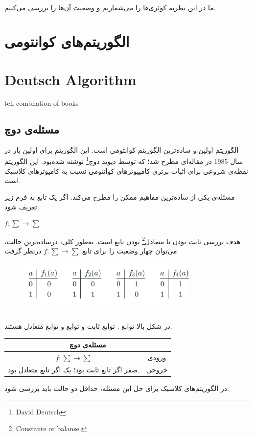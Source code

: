 \documentclass{book}
\begin{document}
ما در این نظریه کوئری‌ها را می‌شماریم و وضعیت آن‌‌ها را بررسی می‌کنیم.

\section*{الگوریتم‌های کوانتومی}


	
\section{Deutsch Algorithm}
tell combnation of books
\subsection{مسئله‌ی دوچ}
الگوریتم  اولین و ساده‌ترین الگوریتم کوانتومی‌ است. این الگوریتم برای اولین بار در سال 1985 در مقاله‌ای مطرح شد؛ که توسط دیوید دوچ\footnote{David Deutsch} نوشته شده‌‌بود. این الگوریتم نقطه‌ی شروعی برای اثبات برتری کامپیوترهای کوانتومی نسبت به کامپوترهای کلاسیک است.

مسئله‌ی  یکی از ساده‌ترین مفاهیم ممکن را مطرح می‌کند. اگر یک تابع به فرم زیر تعریف شود: 
\begin{center}
	$f : \sum \rightarrow \sum$
\end{center}
هدف بررسی ثابت بودن یا متعادل\footnote{Constante or balanse.} بودن تابع  است. 
به‌طور کلی، درساده‌ترین حالت، می‌توان چهار وضعیت را برای تابع $f : \sum \rightarrow \sum$ درنظر گرفت:\\
\begin{figure}[ht]
	\centering
	\includegraphics[width=0.8\textwidth]{Constantorbalanse.png}
	\caption{}
\end{figure}\\
در شکل بالا توابع  ,  توابع ثابت و توابع  و  توابع متعادل هستند.
\begin{center}
\begin{tabular}{|c|c|}
	\hline
	\multicolumn{2}{|c|}{مسئله‌ی دوچ} \\
	\hline
	$f : \sum \rightarrow \sum$ & ورودی \\
	\hline
	صفر اگر تابع ثابت بود؛ یک اگر تابع متعادل بود.  & خروجی \\
	\hline
\end{tabular}
\end{center}
در الگوریتم‌های کلاسیک برای حل این مسئله، حداقل دو حالت باید بررسی شود.
\end{document}
